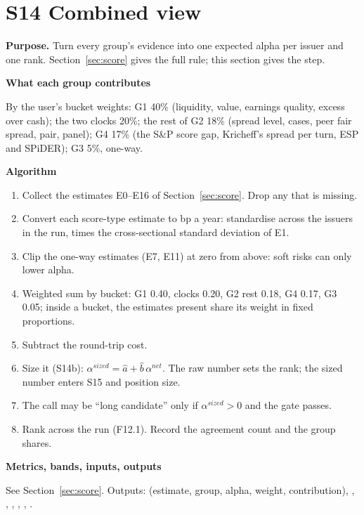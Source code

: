 \documentclass[11pt]{article}
\newcommand{\fld}[1]{\par\medskip\noindent\textbf{\textcolor{steel}{#1}}\par\nopagebreak}
\begin{document}
\section{S14 Combined view}\label{s14}

\textbf{Purpose.} Turn every group's evidence into one expected alpha per issuer and one rank. Section~\ref{sec:score} gives the full rule; this section gives the step.

\fld{What each group contributes} By the user's bucket weights: G1 40\% (liquidity, value, earnings quality, excess over cash); the two clocks 20\%; the rest of G2 18\% (spread level, cases, peer fair spread, pair, panel); G4 17\% (the S\&P score gap, Kricheff's spread per turn, ESP and SPiDER); G3 5\%, one-way.

\fld{Algorithm}
\begin{algobox}
\begin{enumerate}
\item Collect the estimates E0--E16 of Section~\ref{sec:score}. Drop any that is missing.
\item Convert each score-type estimate to bp a year: standardise across the issuers in the run, times the cross-sectional standard deviation of E1.
\item Clip the one-way estimates (E7, E11) at zero from above: soft risks can only lower alpha.
\item Weighted sum by bucket: G1 0.40, clocks 0.20, G2 rest 0.18, G4 0.17, G3 0.05; inside a bucket, the estimates present share its weight in fixed proportions.
\item Subtract the round-trip cost.
\item Size it (S14b): $\alpha^{sized} = \hat a + \hat b\,\alpha^{net}$. The raw number sets the rank; the sized number enters S15 and position size.
\item The call may be ``long candidate'' only if $\alpha^{sized}>0$ and the gate passes.
\item Rank across the run (F12.1). Record the agreement count and the group shares.
\end{enumerate}
\end{algobox}

\fld{Metrics, bands, inputs, outputs} See Section~\ref{sec:score}. Outputs:  (estimate, group, alpha, weight, contribution), , , , , , .
\end{document}
